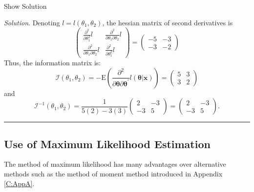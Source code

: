 \documentclass[]{book}
\theoremstyle{definition}
\theoremstyle{definition}
\theoremstyle{definition}
\theoremstyle{remark}
\begin{document}
Show Solution

\hypertarget{SOL:S2b:COV}{}
\emph{Solution}. Denoting \(l=l(\theta_1, \theta_2)\), the hessian
matrix of second derivatives is \[\left(
\begin{array}{cc}
  \frac{ \partial ^2}{\partial \theta_1 ^2 } l & \frac{ \partial ^2}{\partial \theta_1 \partial \theta_2 } l  \\
  \frac{ \partial ^2}{\partial \theta_1 \partial \theta_2 } l & \frac{ \partial ^2}{\partial \theta_1 ^2 } l
\end{array} \right) =
\left(
\begin{array}{cc}
  -5 & -3  \\
  -3 & -2
\end{array} \right)\] Thus, the information matrix is:
\[\mathcal{I}(\theta_1, \theta_2) = -\mathrm{E} \left( \frac{ \partial^2}{\partial \boldsymbol \theta
\partial \boldsymbol \theta^{\prime}} l(\boldsymbol \theta|\mathbf{x}) \right) = \left(
\begin{array}{cc}
  5 & 3  \\
  3 & 2
\end{array} \right)\] and
\[\mathcal{I}^{-1}(\theta_1, \theta_2) = \frac{1}{5(2) - 3(3)}\left(
\begin{array}{cc}
  2 & -3  \\
  -3 & 5
\end{array} \right) = \left(
\begin{array}{cc}
  2 & -3  \\
  -3 & 5
\end{array} \right) .\]

\begin{center}\rule{0.5\linewidth}{\linethickness}\end{center}

\subsection{Use of Maximum Likelihood
Estimation}\label{use-of-maximum-likelihood-estimation}

The method of maximum likelihood has many advantages over alternative
methods such as the method of moment method introduced in Appendix
\ref{C:AppA}.
\end{document}
